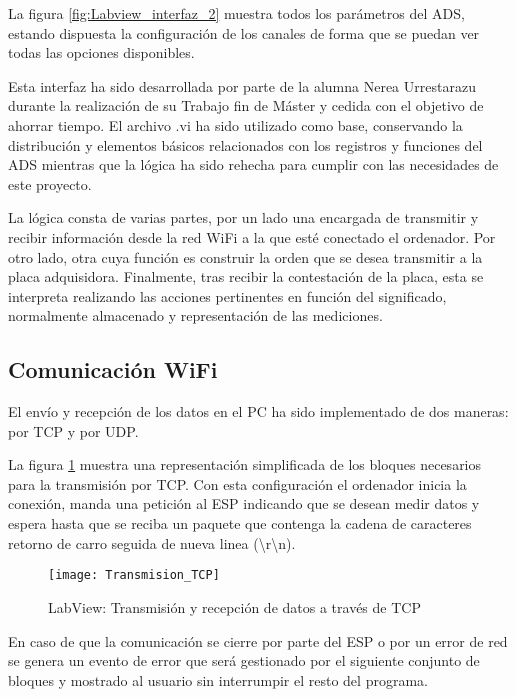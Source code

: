La figura \ref{fig:Labview_interfaz_2} muestra todos los parámetros del ADS, estando dispuesta la configuración de los canales de forma que se puedan ver todas las opciones disponibles.

Esta interfaz ha sido desarrollada por parte de la alumna Nerea Urrestarazu durante la realización de su Trabajo fin de Máster y cedida con el objetivo de ahorrar tiempo. El archivo .vi ha sido utilizado como base, conservando la distribución y elementos básicos relacionados con los registros y funciones del ADS mientras que la lógica ha sido rehecha para cumplir con las necesidades de este proyecto.

La lógica consta de varias partes, por un lado una encargada de transmitir y recibir información desde la red WiFi a la que esté conectado el ordenador. Por otro lado, otra cuya función es construir la orden que se desea transmitir a la placa adquisidora. Finalmente, tras recibir la contestación de la placa, esta se interpreta realizando las acciones pertinentes en función del significado, normalmente almacenado y representación de las mediciones.

\clearpage

\subsection{Comunicación WiFi\label{sec:Software_Labview_WiFi}}

El envío y recepción de los datos en el PC ha sido implementado de dos maneras: por TCP y por UDP. 

La figura \ref{fig:Labview_Transmision_TCP} muestra una representación simplificada de los bloques necesarios para la transmisión por TCP. Con esta configuración el ordenador inicia la conexión, manda una petición al ESP indicando que se desean medir datos y espera hasta que se reciba un paquete que contenga la cadena de caracteres retorno de carro seguida de nueva linea (\textbackslash r\textbackslash n).

\begin{figure} [h]
    \centering
    \texttt{[image: Transmision\_TCP]}
    \caption{LabView: Transmisión y recepción de datos a través de TCP}
    \label{fig:Labview_Transmision_TCP}
\end{figure}

En caso de que la comunicación se cierre por parte del ESP o por un error de red se genera un evento de error que será gestionado por el siguiente conjunto de bloques y mostrado al usuario sin interrumpir el resto del programa.

